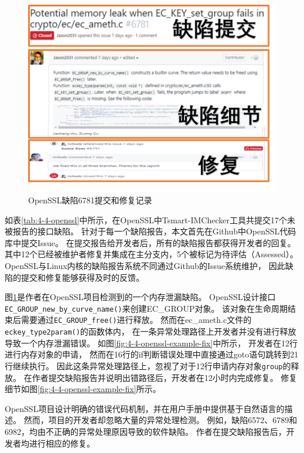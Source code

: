 \begin{figure}[t]
	\centering
	\includegraphics[width=0.8\linewidth]{figures/cp4-openssl-example.png}
	\caption{
		OpenSSL缺陷6781提交和修复记录
	}
	\label{fig:4-4-openssl-example}
\end{figure}



如表\ref{tab:4-4-openssl}中所示，在OpenSSL中Tsmart-IMChecker工具共提交17个未被报告的接口缺陷。
针对于每一个缺陷报告，本文首先在Github中OpenSSL代码库中提交Issue。
在提交报告给开发者后，所有的缺陷报告都获得开发者的回复。
其中12个已经被维护者修复并集成在主分支内，5个被标记为待评估（Assessed）。
OpenSSL与Linux内核的缺陷报告系统不同通过Github的Issue系统维护，
因此缺陷的提交和修复能够获得及时的反馈。



图\ref{fig:4-4-openssl-example}是作者在OpenSSL项目检测到的一个内存泄漏缺陷。
OpenSSL设计接口\texttt{EC\_GROUP\_new\_by\_curve\_name()}来创建EC\_GROUP对象。
该对象在生命周期结束后需要通过\texttt{EC\_GROUP\_free()}进行释放。
然而在ec\_ameth.c文件的\texttt{eckey\_type2param()}的函数体内，
在一条异常处理路径上开发者并没有进行释放导致一个内存泄漏错误。
如图\ref{fig:4-4-openssl-example-fix}中所示，
开发者在12行进行内存对象的申请，
然而在16行的if判断错误处理中直接通过goto语句跳转到21行继续执行。
因此这条异常处理路径上，忽视了对于12行申请内存对象\texttt{group}的释放。
在作者提交缺陷报告并说明出错路径后，开发者在12小时内完成修复。
修复细节如图\ref{fig:4-4-openssl-example-fix}所示。

OpenSSL项目设计明确的错误代码机制，并在用户手册中提供基于自然语言的描述。
然而，项目的开发者却忽略大量的异常处理检测。
例如，缺陷6572、6789和6982，均由不正确的异常处理原因导致的软件缺陷。
作者在提交缺陷报告后，开发者均进行相应的修复。




